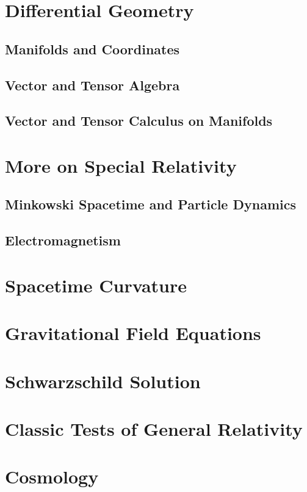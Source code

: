 \documentclass[a4paper]{article}
\theoremstyle{new}
\begin{document}
\begin{center}
\end{center}
\newpage
\section{Differential Geometry}
\subsection{Manifolds and Coordinates}
\newpage
\subsection{Vector and Tensor Algebra}
\newpage
\subsection{Vector and Tensor Calculus on Manifolds}
\newpage
\section{More on Special Relativity}
\subsection{Minkowski Spacetime and Particle Dynamics}
\newpage
\subsection{Electromagnetism}
\newpage
\section{Spacetime Curvature}
\newpage
\section{Gravitational Field Equations}
\newpage
\section{Schwarzschild Solution}
\newpage
\section{Classic Tests of General Relativity}
\newpage
\section{Cosmology}
\end{document}
